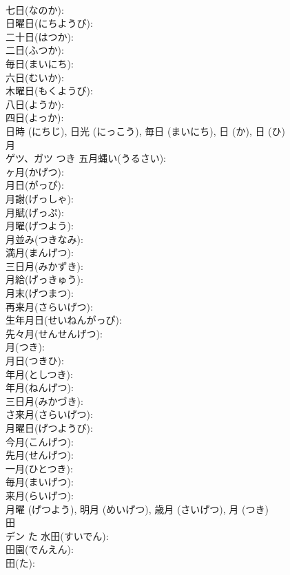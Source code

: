 \documentclass[8pt]{extreport}
\begin{document}
\begin{CJK}{UTF8}{min}
\\	七日(なのか): 
\\	日曜日(にちようび): 
\\	二十日(はつか): 
\\	二日(ふつか): 
\\	毎日(まいにち): 
\\	六日(むいか): 
\\	木曜日(もくようび): 
\\	八日(ようか): 
\\	四日(よっか): 
\\	日時 (にちじ), 日光 (にっこう), 毎日 (まいにち), 日 (か), 日 (ひ)
\\	月			
\\	ゲツ、ガツ	つき	五月蝿い(うるさい): 
\\	ヶ月(かげつ): 
\\	月日(がっぴ): 
\\	月謝(げっしゃ): 
\\	月賦(げっぷ): 
\\	月曜(げつよう): 
\\	月並み(つきなみ): 
\\	満月(まんげつ): 
\\	三日月(みかずき): 
\\	月給(げっきゅう): 
\\	月末(げつまつ): 
\\	再来月(さらいげつ): 
\\	生年月日(せいねんがっぴ): 
\\	先々月(せんせんげつ): 
\\	月(つき): 
\\	月日(つきひ): 
\\	年月(としつき): 
\\	年月(ねんげつ): 
\\	三日月(みかづき): 
\\	さ来月(さらいげつ): 
\\	月曜日(げつようび): 
\\	今月(こんげつ): 
\\	先月(せんげつ): 
\\	一月(ひとつき): 
\\	毎月(まいげつ): 
\\	来月(らいげつ): 
\\	月曜 (げつよう), 明月 (めいげつ), 歳月 (さいげつ), 月 (つき)
\\	田			
\\	デン	た	水田(すいでん): 
\\	田園(でんえん): 
\\	田(た): 

\end{CJK}
\end{document}
